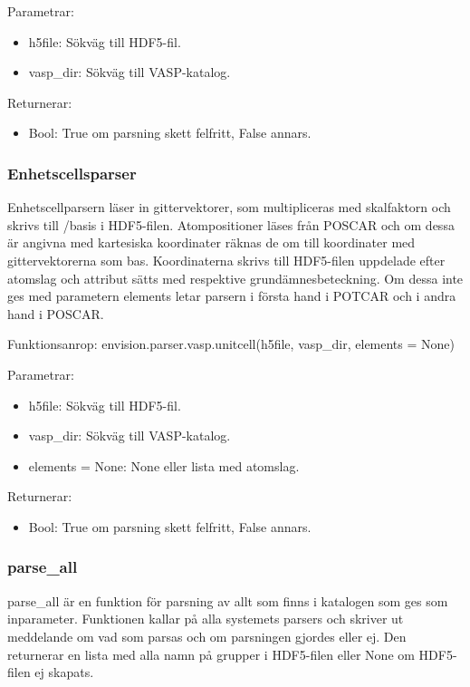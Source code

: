 \documentclass[a4paper,12pt]{article}
\begin{document}
Parametrar:
\begin{itemize}
\setlength\itemsep{0em}
\item h5file: Sökväg till HDF5-fil.
\item vasp\_dir: Sökväg till VASP-katalog.
\end{itemize}

Returnerar:
\begin{itemize}
\setlength\itemsep{0em}
\item Bool: True om parsning skett felfritt, False annars.
\end{itemize}

\subsubsection{Enhetscellsparser}
Enhetscellparsern läser in gittervektorer, som multipliceras med skalfaktorn och skrivs till /basis i HDF5-filen. Atompositioner läses från POSCAR och om dessa är angivna med kartesiska koordinater räknas de om till koordinater med gittervektorerna som bas. Koordinaterna skrivs till HDF5-filen uppdelade efter atomslag och attribut sätts med respektive grundämnesbeteckning. Om dessa inte ges med parametern elements letar parsern i första hand i
POTCAR och i andra hand i POSCAR.

Funktionsanrop: envision.parser.vasp.unitcell(h5file, vasp\_dir, elements = None)

Parametrar:
\begin{itemize}
\setlength\itemsep{0em}
\item h5file: Sökväg till HDF5-fil.
\item vasp\_dir: Sökväg till VASP-katalog.
\item elements = None: None eller lista med atomslag.
\end{itemize}

Returnerar:
\begin{itemize}
\setlength\itemsep{0em}
\item Bool: True om parsning skett felfritt, False annars.
\end{itemize}

\subsubsection{parse\_all}
parse\_all är en funktion för parsning av allt som finns i katalogen som ges som inparameter. Funktionen kallar på alla systemets parsers och skriver ut meddelande om vad som parsas och om
parsningen gjordes eller ej. Den returnerar en lista med alla namn på grupper i HDF5-filen eller None om HDF5-filen ej skapats.
\end{document}
